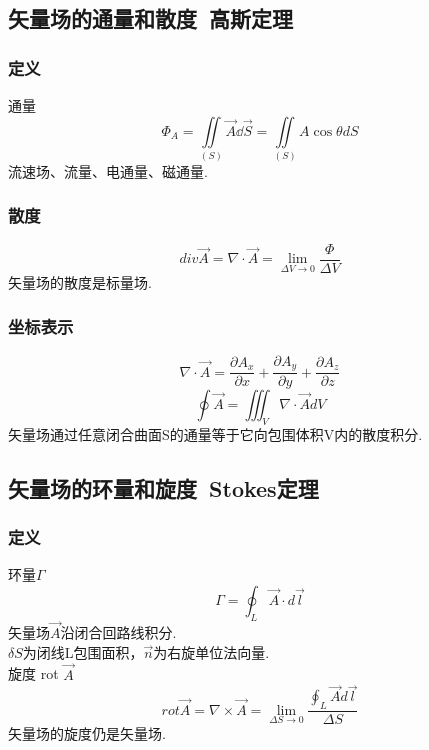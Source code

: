\subsection{矢量场的通量和散度\ 高斯定理}%
\subsubsection{定义}
通量
\begin{equation}\label{VecAnl_eq6}
\Phi_A=\iint\limits_{(S)} \vec{A} \dd{\vec S} = \iint\limits_{(S)} A\cos\theta dS
\end{equation}
流速场、流量、电通量、磁通量.

\subsubsection{散度}
\begin{equation}\label{VecAnl_eq7}
div \vec{A}=\nabla \cdot \vec{A}=\lim_{\Delta V \to 0}\frac{\Phi}{\Delta V}
\end{equation}
矢量场的散度是标量场.

\subsubsection{坐标表示}
\begin{equation}\label{VecAnl_eq8}
\nabla \cdot \vec{A}= \frac{\partial A_x}{\partial x}+\frac{\partial A_y}{\partial y}+\frac{\partial A_z}{\partial z}
\end{equation}
\begin{equation}\label{VecAnl_eq9}
\oint \vec{A}=\iiint_V \nabla \cdot \vec{A} dV
\end{equation}
矢量场通过任意闭合曲面S的通量等于它向包围体积V内的散度积分.
\subsection{矢量场的环量和旋度\ Stokes定理}%

\subsubsection{定义}
环量$\Gamma$
\begin{equation}\label{VecAnl_eq10}
\Gamma=\oint_L \vec{A} \cdot d \vec{l}
\end{equation}
矢量场$\vec{A}$沿闭合回路线积分.\\
$\delta S$为闭线L包围面积，$\vec{n}$为右旋单位法向量.\\
旋度 \qquad rot $\vec{A}$\\
\begin{equation}\label{VecAnl_eq11}
rot \vec{A}=\nabla \times \vec{A}=\lim_{\Delta S \to 0} \frac{\oint_L \vec{A} d\vec{l}}{\Delta S}
\end{equation}
矢量场的旋度仍是矢量场.

